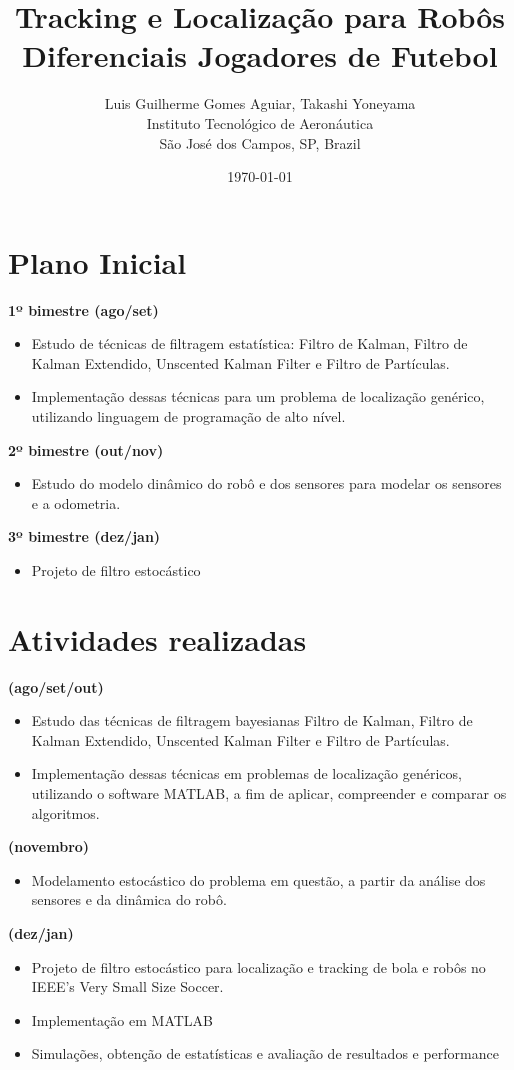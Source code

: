 \documentclass[a4paper,11pt]{article}
\title{\textbf{Tracking e Localização para Robôs Diferenciais Jogadores de Futebol}}
\author{Luis Guilherme Gomes Aguiar, Takashi Yoneyama\\
Instituto Tecnológico de Aeronáutica\\
São José dos Campos, SP, Brazil} %
\date{\today}
\begin{document}
\tableofcontents
\newpage

\maketitle

\section{Plano Inicial}
\textbf{1º bimestre (ago/set)}
\begin{itemize}
    \item Estudo de técnicas de filtragem estatística: Filtro de Kalman, Filtro de Kalman Extendido, Unscented Kalman Filter e Filtro de Partículas.
    \item Implementação dessas técnicas para um problema de localização genérico, utilizando linguagem de programação de alto nível.
\end{itemize}
\textbf{2º bimestre (out/nov)}
\begin{itemize}
    \item Estudo do modelo dinâmico do robô e dos sensores para modelar os sensores e a odometria.
\end{itemize}
\textbf{3º bimestre (dez/jan)}
\begin{itemize}
    \item Projeto de filtro estocástico
\end{itemize}

\section{Atividades realizadas}
\textbf{(ago/set/out)}
\begin{itemize}
    \item Estudo das técnicas de filtragem bayesianas Filtro de Kalman, Filtro de Kalman Extendido, Unscented Kalman Filter e Filtro de Partículas.
    \item Implementação dessas técnicas em problemas de localização genéricos, utilizando o software MATLAB, a fim de aplicar, compreender e comparar os algoritmos.
\end{itemize}
\textbf{(novembro)}
\begin{itemize}
    \item Modelamento estocástico do problema em questão, a partir da análise dos sensores e da dinâmica do robô.
\end{itemize}
\textbf{(dez/jan)}
\begin{itemize}
    \item Projeto de filtro estocástico para localização e tracking de bola e robôs no IEEE’s Very Small Size Soccer.
    \item Implementação em MATLAB
    \item Simulações, obtenção de estatísticas e avaliação de resultados e performance 
\end{itemize}
\end{document}
